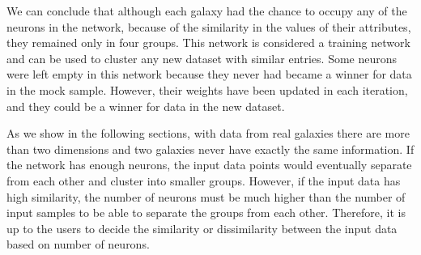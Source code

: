 We can conclude that although each galaxy had the chance to occupy any of the neurons in the network, because of the similarity in the values of their attributes, they remained only in four groups.
This network is considered a training network and can be used to cluster any new dataset with similar entries.
Some neurons were left empty in this network because they never had became a winner for data in the mock sample.
However, their weights have been updated in each iteration, and they could be a winner for data in the new dataset.%

As we show in the following sections, with data from real galaxies there are more than two dimensions and two galaxies never have exactly the same information. 
If the network has enough neurons, the input data points would eventually separate from each other and cluster into smaller groups. 
However, if the input data has high similarity, the number of neurons must be much higher than the number of input samples to be able to separate the groups from each other. 
Therefore, it is up to the users to decide the similarity or dissimilarity between the input data based on number of neurons. 

